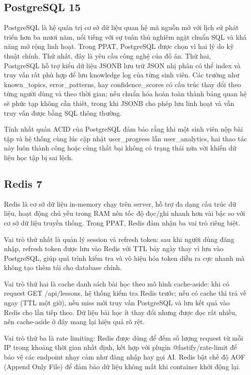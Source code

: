 \documentclass[../main.tex]{subfiles}
\begin{document}
\subsection{PostgreSQL 15}

PostgreSQL là hệ quản trị cơ sở dữ liệu quan hệ mã nguồn mở với lịch sử phát triển hơn ba mươi năm, nổi tiếng với sự tuân thủ nghiêm ngặt chuẩn SQL và khả năng mở rộng linh hoạt. Trong PPAT, PostgreSQL được chọn vì hai lý do kỹ thuật chính. Thứ nhất, đây là yêu cầu công nghệ của đồ án. Thứ hai, PostgreSQL hỗ trợ kiểu dữ liệu JSONB lưu trữ JSON nhị phân có thể index và truy vấn rất phù hợp để lưu knowledge log của từng sinh viên. Các trường như known\_topics, error\_patterns, hay confidence\_scores có cấu trúc thay đổi theo từng người dùng và theo thời gian; nếu chuẩn hóa hoàn toàn thành bảng quan hệ sẽ phức tạp không cần thiết, trong khi JSONB cho phép lưu linh hoạt và vẫn truy vấn được bằng SQL thông thường.

Tính nhất quán ACID của PostgreSQL đảm bảo rằng khi một sinh viên nộp bài tập và hệ thống cùng lúc cập nhật user\_progress lẫn user\_analytics, hai thao tác này luôn thành công hoặc cùng thất bại không có trạng thái nửa vời khiến dữ liệu học tập bị sai lệch.

\subsection{Redis 7}

Redis là cơ sở dữ liệu in-memory chạy trên server, hỗ trợ đa dạng cấu trúc dữ liệu, hoạt động chủ yếu trong RAM nên tốc độ đọc/ghi nhanh hơn vài bậc so với cơ sở dữ liệu truyền thống. Trong PPAT, Redis đảm nhận ba vai trò riêng biệt.

Vai trò thứ nhất là quản lý session và refresh token: sau khi người dùng đăng nhập, refresh token được lưu vào Redis với TTL bảy ngày thay vì lưu vào PostgreSQL, giúp quá trình kiểm tra và vô hiệu hóa token diễn ra cực nhanh mà không tạo thêm tải cho database chính.

Vai trò thứ hai là cache danh sách bài học theo mô hình cache-aside: khi có request GET /\allowbreak api/\allowbreak lessons, hệ thống kiểm tra Redis trước; nếu có cache thì trả về ngay (TTL một giờ), nếu miss mới truy vấn PostgreSQL và lưu kết quả vào Redis cho lần tiếp theo. Dữ liệu bài học ít thay đổi nhưng được đọc rất nhiều, nên cache-aside ở đây mang lại hiệu quả rõ rệt.

Vai trò thứ ba là rate limiting: Redis được dùng để đếm số lượng request từ mỗi IP trong khoảng thời gian nhất định, kết hợp với plugin @fastify/rate-limit để bảo vệ các endpoint nhạy cảm như đăng nhập hay gọi AI. Redis bật chế độ AOF (Append Only File) để đảm bảo dữ liệu không mất khi container khởi động lại.
\end{document}
